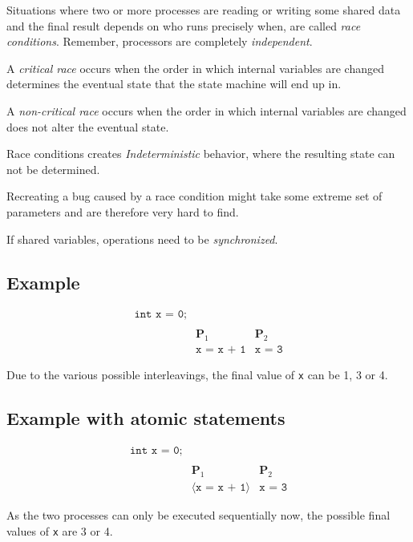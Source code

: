 
Situations where two or more processes are reading or writing some shared data and the final result depends on who runs precisely when, are called \emph{race conditions}. Remember, processors are completely \emph{independent}.

A \emph{critical race} occurs when the order in which internal variables are changed determines the eventual state that the state machine will end up in.

A \emph{non-critical race} occurs when the order in which internal variables are changed does not alter the eventual state.

Race conditions creates \emph{Indeterministic} behavior, where the resulting state can not be determined.

Recreating a bug caused by a race condition might take some extreme set of parameters and are therefore very hard to find.

If shared variables, operations need to be \emph{synchronized}.

\subsection{Example}
\begin{align*}
\texttt{int x = 0;} \\ \\
&\textbf{P}_1 &\textbf{P}_2 \\
&\texttt{x = x + 1} &\texttt{x = 3}
\end{align*}

Due to the various possible interleavings, the final value of \texttt{x} can be 1, 3 or 4.

\subsection{Example with atomic statements}
\begin{align*}
\texttt{int x = 0;} \\ \\
&\textbf{P}_1 &\textbf{P}_2 \\
&\big \langle \texttt{x = x + 1} \big \rangle &\texttt{x = 3}
\end{align*}

As the two processes can only be executed sequentially now, the possible final values of \texttt{x} are 3 or 4.
